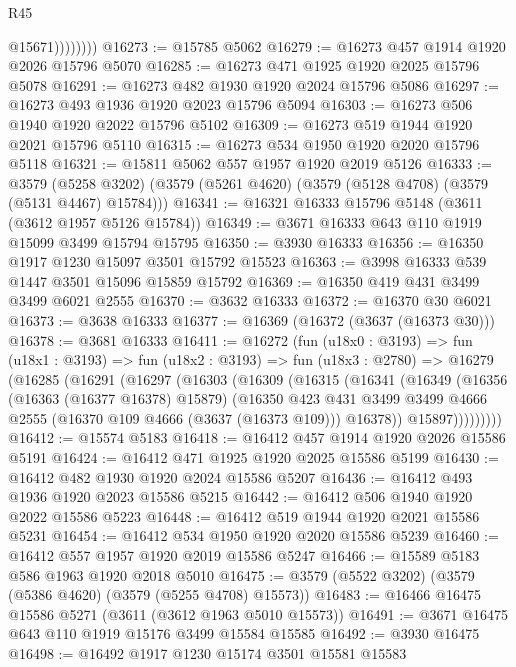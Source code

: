 \begin{lexlean}{R45}
\begin{coremodule}
                    @15671))))))))
@16273 := @15785 @5062
@16279 := @16273 @457 @1914 @1920 @2026 @15796 @5070
@16285 := @16273 @471 @1925 @1920 @2025 @15796 @5078
@16291 := @16273 @482 @1930 @1920 @2024 @15796 @5086
@16297 := @16273 @493 @1936 @1920 @2023 @15796 @5094
@16303 := @16273 @506 @1940 @1920 @2022 @15796 @5102
@16309 := @16273 @519 @1944 @1920 @2021 @15796 @5110
@16315 := @16273 @534 @1950 @1920 @2020 @15796 @5118
@16321 := @15811 @5062 @557 @1957 @1920 @2019 @5126
@16333 := @3579
    (@5258 @3202)
    (@3579 (@5261 @4620) (@3579 (@5128 @4708) (@3579 (@5131 @4467) @15784)))
@16341 := @16321 @16333 @15796 @5148 (@3611 (@3612 @1957 @5126 @15784))
@16349 := @3671 @16333 @643 @110 @1919 @15099 @3499 @15794 @15795
@16350 := @3930 @16333
@16356 := @16350 @1917 @1230 @15097 @3501 @15792 @15523
@16363 := @3998 @16333 @539 @1447 @3501 @15096 @15859 @15792
@16369 := @16350 @419 @431 @3499 @3499 @6021 @2555
@16370 := @3632 @16333
@16372 := @16370 @30 @6021
@16373 := @3638 @16333
@16377 := @16369 (@16372 (@3637 (@16373 @30)))
@16378 := @3681 @16333
@16411 := @16272
    (fun (u18x0 : @3193) =>
    fun (u18x1 : @3193) =>
    fun (u18x2 : @3193) =>
    fun (u18x3 : @2780) =>
    @16279
      (@16285
        (@16291
          (@16297
            (@16303
              (@16309
                (@16315
                  (@16341
                    (@16349
                      (@16356
                        (@16363 (@16377 @16378) @15879)
                        (@16350
                          @423
                          @431
                          @3499
                          @3499
                          @4666
                          @2555
                          (@16370 @109 @4666 (@3637 (@16373 @109)))
                          @16378))
                      @15897)))))))))
@16412 := @15574 @5183
@16418 := @16412 @457 @1914 @1920 @2026 @15586 @5191
@16424 := @16412 @471 @1925 @1920 @2025 @15586 @5199
@16430 := @16412 @482 @1930 @1920 @2024 @15586 @5207
@16436 := @16412 @493 @1936 @1920 @2023 @15586 @5215
@16442 := @16412 @506 @1940 @1920 @2022 @15586 @5223
@16448 := @16412 @519 @1944 @1920 @2021 @15586 @5231
@16454 := @16412 @534 @1950 @1920 @2020 @15586 @5239
@16460 := @16412 @557 @1957 @1920 @2019 @15586 @5247
@16466 := @15589 @5183 @586 @1963 @1920 @2018 @5010
@16475 := @3579 (@5522 @3202) (@3579 (@5386 @4620) (@3579 (@5255 @4708) @15573))
@16483 := @16466 @16475 @15586 @5271 (@3611 (@3612 @1963 @5010 @15573))
@16491 := @3671 @16475 @643 @110 @1919 @15176 @3499 @15584 @15585
@16492 := @3930 @16475
@16498 := @16492 @1917 @1230 @15174 @3501 @15581 @15583

\end{coremodule}
\end{lexlean}
